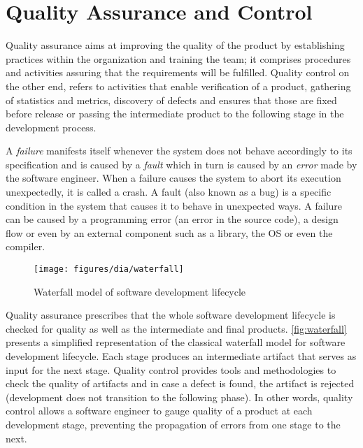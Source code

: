 \section{Quality Assurance and Control}
Quality assurance aims at improving the quality of the product by establishing
practices within the organization and training the team; it comprises procedures
and activities assuring that the requirements will be fulfilled. Quality control
on the other end, refers to activities that enable verification of a product,
gathering of statistics and metrics, discovery of defects and ensures that those
are fixed before release or passing the intermediate product to the following
stage in the development process.

A \emph{failure} manifests itself whenever the system does not behave
accordingly to its specification and is caused by a \emph{fault} which in turn
is caused by an \emph{error} made by the software engineer. When a failure
causes the system to abort its execution unexpectedly, it is called a crash. A
fault (also known as a bug) is a specific condition in the system that causes it
to behave in unexpected ways. A failure can be caused by a programming error (an
error in the source code), a design flow or even by an external component such
as a library, the \ac{OS} or even the compiler.

\begin{figure}[h]
    \centering
    \texttt{[image: figures/dia/waterfall]}
    \caption{Waterfall model of software development lifecycle}
    \label{fig:waterfall}
\end{figure}

Quality assurance prescribes that the whole software development lifecycle is
checked for quality as well as the intermediate and final products.
\autoref{fig:waterfall} presents a simplified representation of the classical
waterfall model for software development lifecycle. Each stage produces an
intermediate artifact that serves as input for the next stage. Quality control
provides tools and methodologies to check the quality of artifacts and in case a
defect is found, the artifact is rejected (development does not transition to
the following phase). In other words, quality control allows a software engineer
to gauge quality of a product at each development stage, preventing the
propagation of errors from one stage to the next.

